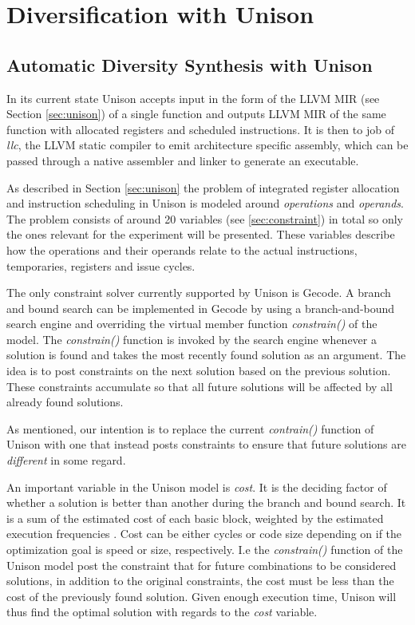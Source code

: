 \chapter{Diversification with Unison}

\section{Automatic Diversity Synthesis with Unison}
\label{sec:unison-model}

In its current state Unison accepts input in the form of the LLVM MIR (see Section
\ref{sec:unison}) of a single function\cite{unison-docs} and outputs LLVM MIR of the same
function with allocated registers and scheduled instructions. It is then to job of
\textit{llc}, the LLVM static compiler to emit architecture specific assembly, which can
be passed through a native assembler and linker to generate an executable\cite{llvm-llc}.

As described in Section \ref{sec:unison} the problem of integrated register allocation and
instruction scheduling in Unison is modeled around \textit{operations} and \textit{operands}.
The problem consists of around 20 variables (see \ref{sec:constraint}) in total so only the
ones relevant for the experiment will be presented. These variables describe how the
operations and their operands relate to the actual instructions, temporaries, registers
and issue cycles.

The only constraint solver currently supported by Unison is Gecode\cite{unison-docs}. A
branch and bound search can be implemented in Gecode by using a branch-and-bound search
engine and overriding the virtual member function \textit{constrain()} of the model. The
\textit{constrain()} function is invoked by the search engine whenever a solution is found
and takes the most recently found solution as an argument. The idea is to post constraints
on the next solution based on the previous solution. These constraints accumulate so
that all future solutions will be affected by all already found solutions.

As mentioned, our intention is to replace the current \textit{contrain()} function of
Unison with one that instead posts constraints to ensure that future solutions are
\textit{different} in some regard.

An important variable in the Unison model is \textit{cost}. It is the deciding factor
of whether a solution is better than another during the branch and bound search. It is a
sum of the estimated cost of each basic block, weighted by the estimated execution
frequencies \cite{unison-docs}. Cost can be either cycles or code size depending on if the
optimization goal is speed or size, respectively. I.e the \textit{constrain()} function of
the Unison model post the constraint that for future combinations to be considered
solutions, in addition to the original constraints, the cost must be less than the cost of
the previously found solution. Given enough execution time, Unison will thus find the
optimal solution with regards to the \textit{cost} variable.


